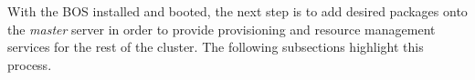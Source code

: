 With the BOS installed and booted, the next step is to add desired \FSP{} packages
onto the {\em master} server in order to provide provisioning and resource
management services for the rest of the cluster. The following subsections
highlight this process.
